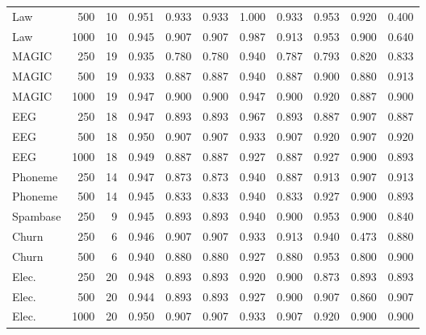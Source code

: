 \documentclass[pdflatex,sn-mathphys-num,iicol]{sn-jnl}
\theoremstyle{thmstyleone}
\theoremstyle{thmstyletwo}
\theoremstyle{thmstylethree}
\begin{document}
\begin{table}[t]
\begin{tabular}{lrrrrrrrrrr}
Law & 500 & 10 & 0.951 & 0.933 & 0.933 & 1.000 & 0.933 & 0.953 & 0.920 & 0.400 \\
Law & 1000 & 10 & 0.945 & 0.907 & 0.907 & 0.987 & 0.913 & 0.953 & 0.900 & 0.640 \\
MAGIC & 250 & 19 & 0.935 & 0.780 & 0.780 & 0.940 & 0.787 & 0.793 & 0.820 & 0.833 \\
MAGIC & 500 & 19 & 0.933 & 0.887 & 0.887 & 0.940 & 0.887 & 0.900 & 0.880 & 0.913 \\
MAGIC & 1000 & 19 & 0.947 & 0.900 & 0.900 & 0.947 & 0.900 & 0.920 & 0.887 & 0.900 \\
EEG & 250 & 18 & 0.947 & 0.893 & 0.893 & 0.967 & 0.893 & 0.887 & 0.907 & 0.887 \\
EEG & 500 & 18 & 0.950 & 0.907 & 0.907 & 0.933 & 0.907 & 0.920 & 0.907 & 0.920 \\
EEG & 1000 & 18 & 0.949 & 0.887 & 0.887 & 0.927 & 0.887 & 0.927 & 0.900 & 0.893 \\
Phoneme & 250 & 14 & 0.947 & 0.873 & 0.873 & 0.940 & 0.887 & 0.913 & 0.907 & 0.913 \\
Phoneme & 500 & 14 & 0.945 & 0.833 & 0.833 & 0.940 & 0.833 & 0.927 & 0.900 & 0.893 \\
Spambase & 250 & 9 & 0.945 & 0.893 & 0.893 & 0.940 & 0.900 & 0.953 & 0.900 & 0.840 \\
Churn & 250 & 6 & 0.946 & 0.907 & 0.907 & 0.933 & 0.913 & 0.940 & 0.473 & 0.880 \\
Churn & 500 & 6 & 0.940 & 0.880 & 0.880 & 0.927 & 0.880 & 0.953 & 0.800 & 0.900 \\
Elec. & 250 & 20 & 0.948 & 0.893 & 0.893 & 0.920 & 0.900 & 0.873 & 0.893 & 0.893 \\
Elec. & 500 & 20 & 0.944 & 0.893 & 0.893 & 0.927 & 0.900 & 0.907 & 0.860 & 0.907 \\
Elec. & 1000 & 20 & 0.950 & 0.907 & 0.907 & 0.933 & 0.907 & 0.920 & 0.900 & 0.900 \\
\bottomrule
\end{tabular}

\end{table}
\end{document}
